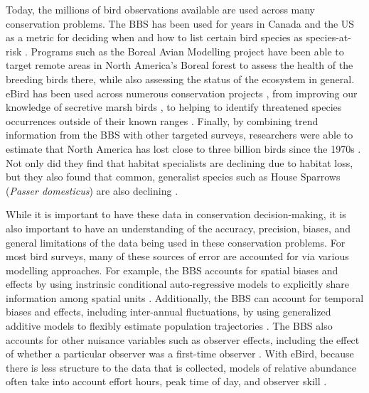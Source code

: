 \par Today, the millions of bird observations available are used across many conservation problems.
The BBS has been used for years in Canada and the US as a metric for deciding when and how to list certain bird species as species-at-risk \citep{hudson_role_2017}.
Programs such as the Boreal Avian Modelling project \citep{cumming_toward_2010, solymos_bam_2020} have been able to target remote areas in North America's Boreal forest to assess the health of the breeding birds there, while also assessing the status of the ecosystem in general.
eBird has been used across numerous conservation projects \citep{sullivan_ebird_2009, sullivan_ebird_2014}, from improving our knowledge of secretive marsh birds \citep{bianchini_using_2023}, to helping to identify threatened species occurrences outside of their known ranges \citep{lin_using_2022}.
Finally, by combining trend information from the BBS with other targeted surveys, researchers were able to estimate that North America has lost close to three billion birds since the 1970s \citep{rosenberg_decline_2019}.
Not only did they find that habitat specialists are declining due to habitat loss, but they also found that common, generalist species such as House Sparrows (\textit{Passer domesticus}) are also declining \citep{rosenberg_decline_2019}.

\par While it is important to have these data in conservation decision-making, it is also important to have an understanding of the accuracy, precision, biases, and general limitations of the data being used in these conservation problems.
For most bird surveys, many of these sources of error are accounted for via various modelling approaches.
For example, the BBS accounts for spatial biases and effects by using instrinsic conditional auto-regressive models \citep{besag_bayesian_1991} to explicitly share information among spatial units \citep{smith_spatially_2023, smith_patterns_2023}. 
Additionally, the BBS can account for temporal biases and effects, including inter-annual fluctuations, by using generalized additive models \citep{wood_generalized_2017} to flexibly estimate population trajectories \citep{smith_north_2021}.
The BBS also accounts for other nuisance variables such as observer effects, including the effect of whether a particular observer was a first-time observer \citep{kendall_first-time_1996}.
With eBird, because there is less structure to the data that is collected, models of relative abundance often take into account effort hours, peak time of day, and observer skill \citep{johnston_estimates_2018, fink_double_2023}.


